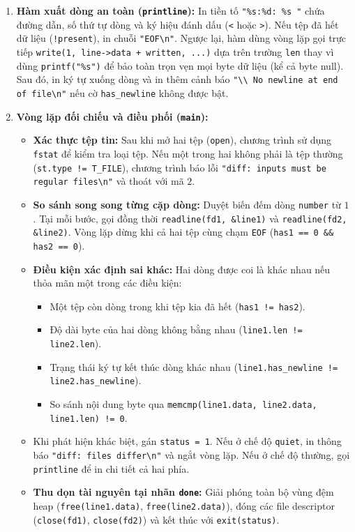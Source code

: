\documentclass[12pt,a4paper]{article}
\begin{document}
\begin{enumerate}
\begin{itemize}
  \end{itemize}
  \item \textbf{Hàm xuất dòng an toàn (\texttt{printline}):}
  In tiền tố \texttt{"\%s:\%d: \%s "} chứa đường dẫn, số thứ tự dòng và ký hiệu đánh dấu (\texttt{<} hoặc \texttt{>}). Nếu tệp đã hết dữ liệu (\texttt{!present}), in chuỗi \texttt{"EOF\textbackslash n"}. Ngược lại, hàm dùng vòng lặp gọi trực tiếp \texttt{write(1, line->data + written, ...)} dựa trên trường \texttt{len} thay vì dùng \texttt{printf("\%s")} để bảo toàn trọn vẹn mọi byte dữ liệu (kể cả byte null). Sau đó, in ký tự xuống dòng và in thêm cảnh báo \texttt{"\textbackslash\textbackslash\ No newline at end of file\textbackslash n"} nếu cờ \texttt{has\_newline} không được bật.
  \item \textbf{Vòng lặp đối chiếu và điều phối (\texttt{main}):}
  \begin{itemize}
    \item \textbf{Xác thực tệp tin:} Sau khi mở hai tệp (\texttt{open}), chương trình sử dụng \texttt{fstat} để kiểm tra loại tệp. Nếu một trong hai không phải là tệp thường (\texttt{st.type != T\_FILE}), chương trình báo lỗi \texttt{"diff: inputs must be regular files\textbackslash n"} và thoát với mã $2$.
    \item \textbf{So sánh song song từng cặp dòng:} Duyệt biến đếm dòng \texttt{number} từ $1$. Tại mỗi bước, gọi đồng thời \texttt{readline(fd1, \&line1)} và \texttt{readline(fd2, \&line2)}. Vòng lặp dừng khi cả hai tệp cùng chạm \texttt{EOF} (\texttt{has1 == 0 \&\& has2 == 0}).
    \item \textbf{Điều kiện xác định sai khác:} Hai dòng được coi là khác nhau nếu thỏa mãn một trong các điều kiện:
    \begin{itemize}
      \item Một tệp còn dòng trong khi tệp kia đã hết (\texttt{has1 != has2}).
      \item Độ dài byte của hai dòng không bằng nhau (\texttt{line1.len != line2.len}).
      \item Trạng thái ký tự kết thúc dòng khác nhau (\texttt{line1.has\_newline != line2.has\_newline}).
      \item So sánh nội dung byte qua \texttt{memcmp(line1.data, line2.data, line1.len) != 0}.
    \end{itemize}
    \item Khi phát hiện khác biệt, gán \texttt{status = 1}. Nếu ở chế độ \texttt{quiet}, in thông báo \texttt{"diff: files differ\textbackslash n"} và ngắt vòng lặp. Nếu ở chế độ thường, gọi \texttt{printline} để in chi tiết cả hai phía.
    \item \textbf{Thu dọn tài nguyên tại nhãn \texttt{done}:} Giải phóng toàn bộ vùng đệm heap (\texttt{free(line1.data)}, \texttt{free(line2.data)}), đóng các file descriptor (\texttt{close(fd1)}, \texttt{close(fd2)}) và kết thúc với \texttt{exit(status)}.
  \end{itemize}
\end{enumerate}
\end{document}

